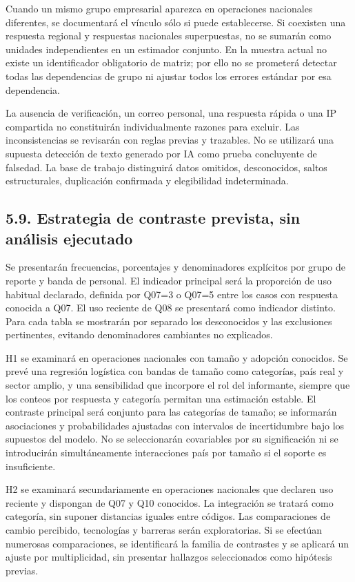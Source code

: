 \documentclass[12pt,letterpaper]{article}
\begin{document}
Cuando un mismo grupo empresarial aparezca en operaciones nacionales diferentes, se documentará el vínculo sólo si puede establecerse. Si coexisten una respuesta regional y respuestas nacionales superpuestas, no se sumarán como unidades independientes en un estimador conjunto. En la muestra actual no existe un identificador obligatorio de matriz; por ello no se prometerá detectar todas las dependencias de grupo ni ajustar todos los errores estándar por esa dependencia.

La ausencia de verificación, un correo personal, una respuesta rápida o una IP compartida no constituirán individualmente razones para excluir. Las inconsistencias se revisarán con reglas previas y trazables. No se utilizará una supuesta detección de texto generado por IA como prueba concluyente de falsedad. La base de trabajo distinguirá datos omitidos, desconocidos, saltos estructurales, duplicación confirmada y elegibilidad indeterminada.

\subsection*{5.9. Estrategia de contraste prevista, sin análisis ejecutado}
Se presentarán frecuencias, porcentajes y denominadores explícitos por grupo de reporte y banda de personal. El indicador principal será la proporción de uso habitual declarado, definida por Q07=3 o Q07=5 entre los casos con respuesta conocida a Q07. El uso reciente de Q08 se presentará como indicador distinto. Para cada tabla se mostrarán por separado los desconocidos y las exclusiones pertinentes, evitando denominadores cambiantes no explicados.

H1 se examinará en operaciones nacionales con tamaño y adopción conocidos. Se prevé una regresión logística con bandas de tamaño como categorías, país real y sector amplio, y una sensibilidad que incorpore el rol del informante, siempre que los conteos por respuesta y categoría permitan una estimación estable. El contraste principal será conjunto para las categorías de tamaño; se informarán asociaciones y probabilidades ajustadas con intervalos de incertidumbre bajo los supuestos del modelo. No se seleccionarán covariables por su significación ni se introducirán simultáneamente interacciones país por tamaño si el soporte es insuficiente.

H2 se examinará secundariamente en operaciones nacionales que declaren uso reciente y dispongan de Q07 y Q10 conocidos. La integración se tratará como categoría, sin suponer distancias iguales entre códigos. Las comparaciones de cambio percibido, tecnologías y barreras serán exploratorias. Si se efectúan numerosas comparaciones, se identificará la familia de contrastes y se aplicará un ajuste por multiplicidad, sin presentar hallazgos seleccionados como hipótesis previas.
\end{document}
